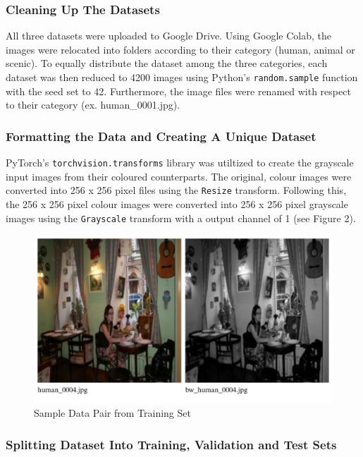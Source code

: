 \documentclass{article} %
\begin{document}
\subsubsection{Cleaning Up The Datasets}

All three datasets were uploaded to Google Drive. Using Google Colab, the images were relocated into folders according to their category (human, animal or scenic). To equally distribute the dataset among the three categories, each dataset was then reduced to 4200 images using Python’s \verb|random.sample| function with the seed set to 42. Furthermore, the image files were renamed with respect to their category (ex. human\_0001.jpg). 

\subsubsection{Formatting the Data and Creating A Unique Dataset}

PyTorch’s \verb|torchvision.transforms| library was utiltized to create the grayscale input images from their coloured counterparts. The original, colour images were converted into 256 x 256 pixel files using the \verb|Resize| transform. Following this, the 256 x 256 pixel colour images were converted into 256 x 256 pixel grayscale images using the \verb|Grayscale| transform with a output channel of 1 (see Figure 2). 

\begin{figure}[h]            %
  \centering
  \includegraphics[width=1\linewidth]{Figs/Data Example.png}
  \caption{Sample Data Pair from Training Set}
  \label{fig:data_example}
\end{figure}

 \subsubsection{Splitting Dataset Into Training, Validation and Test Sets}
\end{document}
